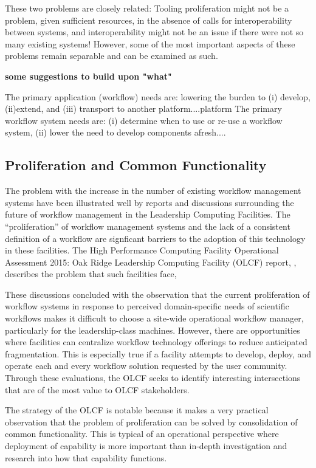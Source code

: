 These two problems are closely related: Tooling proliferation might not be a
problem, given sufficient resources, in the absence of calls for
interoperability between systems, and interoperability might not be an issue if
there were not so many existing systems! However, some of the most important
aspects of these problems remain separable and can be examined as such.

{\bf some suggestions to  build upon "what"} 

The primary application (workflow) needs are: lowering the burden to (i) develop, (ii)extend, and (iii) transport to another platform....platform The primary workflow system needs are: (i) determine when to use or re-use a workflow system, (ii) lower the need to develop components afresh....



\subsection{Proliferation and Common Functionality} \label{commonFunc}

The problem with the increase in the number of existing workflow management
systems have been illustrated well by reports and discussions surrounding the
future of workflow management in the Leadership Computing Facilities. The
``proliferation'' of workflow management systems and the lack of a consistent
definition of a workflow are signficant barriers to the adoption of this
technology in these facilities. The High Performance Computing Facility
Operational Assessment 2015: Oak Ridge Leadership Computing Facility (OLCF)
report, \cite{barker_scientific_2007}, describes the problem that such
facilities face, \begin{displayquote} These discussions concluded with the
observation that the current proliferation of workflow systems in response to
perceived domain-specific needs of scientific workflows makes it difficult to
choose a site-wide operational workflow manager, particularly for the
leadership-class machines. However, there are opportunities where facilities can
centralize workflow technology offerings to reduce anticipated fragmentation.
This is especially true if a facility attempts to develop, deploy, and operate
each and every workflow solution requested by the user community. Through these
evaluations, the OLCF seeks to identify interesting intersections that are of
the most value to OLCF stakeholders.  \end{displayquote} The strategy of the
OLCF is notable because it makes a very practical observation that the problem
of proliferation can be solved by consolidation of common functionality. This is
typical of an operational perspective where deployment of capability is more
important than in-depth investigation and research into how that capability
functions. 

